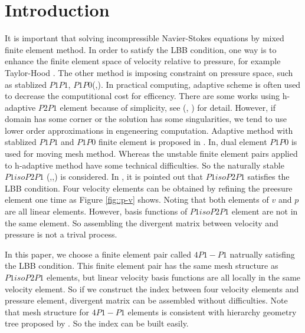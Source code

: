 \documentclass[a4paper, 11pt]{article}
\begin{document}
\section{Introduction}

    It is important that solving incompressible
    Navier-Stokes equations by mixed finite element method. In order to
    satisfy the LBB condition, one way is to enhance the finite
    element space of velocity relative to pressure, for example 
    Taylor-Hood \cite{taylor1974navier}. The other method is imposing
    constraint on pressure space, such as stablized $P1P1$,
    $P1P0$(\cite{li2009performance},\cite{bochev2006stabilization}). 
    In practical computing, adaptive scheme is often used to decrease the
    computitional cost for efficency. There are some works
    using h-adaptive $P2P1$ element because of simplicity, see
    (\cite{danaila2014newton},\cite{ebeida2009unsteady}
    \cite{berrone2009space}) for detail. However, if domain has some
    corner or the solution has some singularities, we tend to use lower
    order approximations in engeneering computation. Adaptive method with
    stablized $P1P1$ and $P1P0$ finite element is proposed in
    \cite{zheng2010posteriori}. In\cite{di2005moving},
    dual element $P1P0$ is used for moving mesh method. Whereas the
    unstable finite element pairs applied to h-adaptive method have some
    technical difficulties. So the naturally stable $P1isoP2P1$
    (\cite{vanden2009kinetic},\cite{fujima1998iso},\cite{bercovier1979error})
    is considered. In \cite{bercovier1979error}, it is pointed out that
    $P1isoP2P1$  satisfies the LBB condition. Four velocity
    elements can be obtained by refining the preesure element one
    time as Figure \ref{fig::p-v} shows. Noting that both elements of
    $v$ and $p$ are all linear elements. However, basis functions of
    $P1isoP2P1$ element are not in the same element. So
    assembling the divergent matrix between velocity and pressure is
    not a trival process. 
    
    In this paper, we choose a finite element pair called $4P1-P1$
    natrually satisfing the LBB condition. This finite element
    pair has the same mesh structure as $P1isoP2P1$ elements, but
    linear velocity basis functions are all locally in the same velocity
    element. So if we construct the index between four velocity
    elements and pressure element, divergent matrix can be assembled
    without difficulties. Note that mesh structure for $4P1-P1$ elements is
    consistent with hierarchy geometry tree proposed by
    \cite{li2005multi}. So the index can be built easily.
\end{document}
